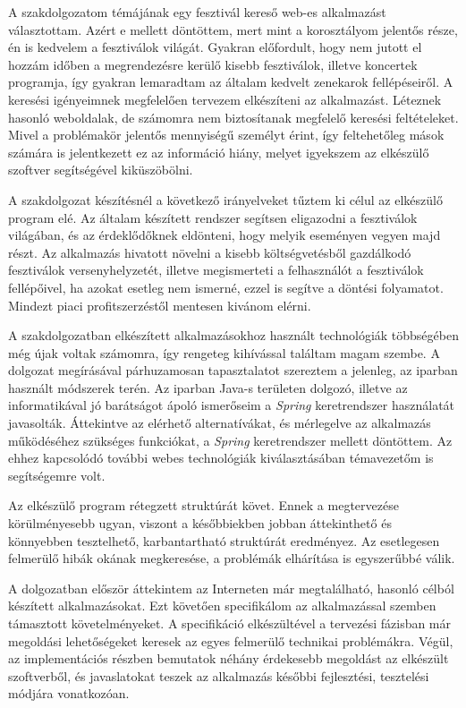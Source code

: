 
A szakdolgozatom témájának egy fesztivál kereső web-es alkalmazást választottam. Azért e mellett döntöttem, mert mint a korosztályom jelentős része, én is kedvelem a fesztiválok világát. Gyakran előfordult, hogy nem jutott el hozzám időben a megrendezésre kerülő kisebb fesztiválok, illetve koncertek programja, így gyakran lemaradtam az általam kedvelt zenekarok fellépéseiről. A keresési igényeimnek megfelelően tervezem elkészíteni az alkalmazást. Léteznek hasonló weboldalak, de számomra nem biztosítanak megfelelő keresési feltételeket. Mivel a problémakör jelentős mennyiségű személyt érint, így feltehetőleg mások számára is jelentkezett ez az információ hiány, melyet igyekszem az elkészülő szoftver segítségével kiküszöbölni. 

A szakdolgozat készítésnél a következő irányelveket tűztem ki célul az elkészülő program elé.
Az általam készített rendszer segítsen eligazodni a fesztiválok világában, és az érdeklődőknek eldönteni, hogy melyik eseményen vegyen majd részt. Az alkalmazás hivatott növelni a kisebb költségvetésből gazdálkodó fesztiválok versenyhelyzetét, illetve megismerteti a felhasználót a fesztiválok fellépőivel, ha azokat esetleg nem ismerné, ezzel is segítve a döntési folyamatot. Mindezt piaci profitszerzéstől mentesen kivánom elérni.

A szakdolgozatban elkészített alkalmazásokhoz használt technológiák többségében még újak voltak számomra, így rengeteg kihívással találtam magam szembe. A dolgozat megírásával párhuzamosan tapasztalatot szereztem a jelenleg, az iparban használt módszerek terén. Az iparban Java-s területen dolgozó, illetve az informatikával jó barátságot ápoló ismerőseim a \textit{Spring} keretrendszer használatát javasolták. Áttekintve az elérhető alternatívákat, és mérlegelve az alkalmazás működéséhez szükséges funkciókat, a \textit{Spring} keretrendszer mellett döntöttem. Az ehhez kapcsolódó további webes technológiák kiválasztásában témavezetőm is segítségemre volt.

Az elkészülő program rétegzett struktúrát követ. Ennek a megtervezése körülményesebb ugyan, viszont a későbbiekben jobban áttekinthető és könnyebben tesztelhető, karbantartható struktúrát eredményez. Az esetlegesen felmerülő hibák okának megkeresése, a problémák elhárítása is egyszerűbbé válik.

A dolgozatban először áttekintem az Interneten már megtalálható, hasonló célból készített alkalmazásokat. Ezt követően specifikálom az alkalmazással szemben támasztott követelményeket. A specifikáció elkészültével a tervezési fázisban már megoldási lehetőségeket keresek az egyes felmerülő technikai problémákra. Végül, az implementációs részben bemutatok néhány érdekesebb megoldást az elkészült szoftverből, és javaslatokat teszek az alkalmazás későbbi fejlesztési, tesztelési módjára vonatkozóan.
